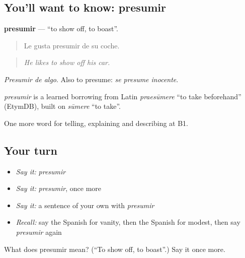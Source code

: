 \subsection*{You'll want to know: presumir}
\textbf{presumir} — \textquotedblleft{}to show off, to boast\textquotedblright{}.

\begin{quote}
Le gusta presumir de su coche.
\end{quote}

\begin{quote}
\emph{He likes to show off his car.}
\end{quote}

\emph{Presumir de algo}. Also to presume: \emph{se presume inocente}.

\begin{cousinweb}
\emph{presumir} is a learned borrowing from Latin \emph{praesūmere} \textquotedblleft{}to take beforehand\textquotedblright{} (EtymDB), built on \emph{sūmere} \textquotedblleft{}to take\textquotedblright{}.
\end{cousinweb}

\begin{grammarlens}[title={What you've built}]
One more word for telling, explaining and describing at B1.
\end{grammarlens}

\subsection*{Your turn}
\begin{itemize}
\raggedright
  \item \emph{Say it:} \emph{presumir}
  \item \emph{Say it:} \emph{presumir}, once more
  \item \emph{Say it:} a sentence of your own with \emph{presumir}
  \item \emph{Recall:} say the Spanish for vanity, then the Spanish for modest, then say \emph{presumir} again
\end{itemize}

\begin{tcolorbox}[breakable,colback=teal!4,colframe=teal!35!black,title={Before you move on}]
What does presumir mean? (\textquotedblleft{}To show off, to boast\textquotedblright{}.) Say it once more.
\end{tcolorbox}
